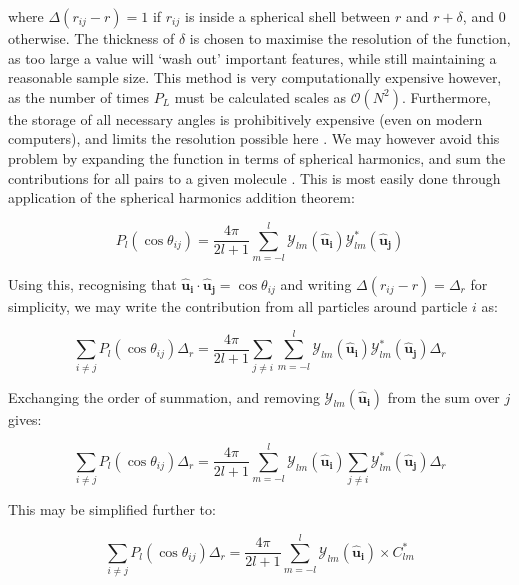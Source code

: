 \documentclass[11pt, a4paper]{article} %
\begin{document}
\begin{appendices}
where $\Delta(r_{ij}-r) = 1$ if $r_{ij}$ is inside a spherical shell between $r$ and $r+\delta$, and $0$ otherwise. The thickness of $\delta$ is chosen to maximise the resolution of the function, as too large a value will `wash out' important features, while still maintaining a reasonable sample size. This method is very computationally expensive however, as the number of times $P_{L}$ must be calculated scales as $\mathcal{O}(N^{2})$. Furthermore, the storage of all necessary angles is prohibitively expensive (even on modern computers), and limits the resolution possible here \cite{Soper1998}. We may however avoid this problem by expanding the function in terms of spherical harmonics, and sum the contributions for all pairs to a given molecule \cite{Soper1994}. This is most easily done through application of the spherical harmonics addition theorem:

\begin{equation}
P_{l}(\cos \theta_{ij}) = \frac{4\pi}{2l+1} \sum_{m=-l}^{l} \mathcal{Y}_{lm}(\boldsymbol{\hat{u}_{i}}) \mathcal{Y}_{lm}^{*}(\boldsymbol{\hat{u}_{j}})
\end{equation}

Using this, recognising that $\boldsymbol{\hat{u}_{i}}\cdot \boldsymbol{\hat{u}_{j}} = \cos \theta_{ij}$ and writing  $\Delta(r_{ij}-r) = \Delta_{r}$ for simplicity, we may write the contribution from all particles around particle $i$ as:

\begin{equation}
\sum_{i \neq j} P_{l}(\cos \theta_{ij}) \Delta_{r} =  \frac{4\pi}{2l+1} \sum_{j \neq i} \sum_{m=-l}^{l} \mathcal{Y}_{lm}(\boldsymbol{\hat{u}_{i}}) \mathcal{Y}_{lm}^{*}(\boldsymbol{\hat{u}_{j}}) \Delta_{r}
\end{equation}

Exchanging the order of summation, and removing $\mathcal{Y}_{lm}(\boldsymbol{\hat{u}_{i}})$ from the sum over $j$ gives:

\begin{equation}
\sum_{i \neq j} P_{l}(\cos \theta_{ij}) \Delta_{r} =  \frac{4\pi}{2l+1} \sum_{m=-l}^{l} \mathcal{Y}_{lm}(\boldsymbol{\hat{u}_{i}}) \sum_{j \neq i}  \mathcal{Y}_{lm}^{*}(\boldsymbol{\hat{u}_{j}}) \Delta_{r}
\end{equation}

This may be simplified further to:

\begin{equation} \label{eq:pairwise_finalres}
\sum_{i \neq j} P_{l}(\cos \theta_{ij}) \Delta_{r} =  \frac{4\pi}{2l+1} \sum_{m=-l}^{l} \mathcal{Y}_{lm}(\boldsymbol{\hat{u}_{i}}) \times C_{lm}^{*}
\end{equation}


\end{appendices}
\end{document}

